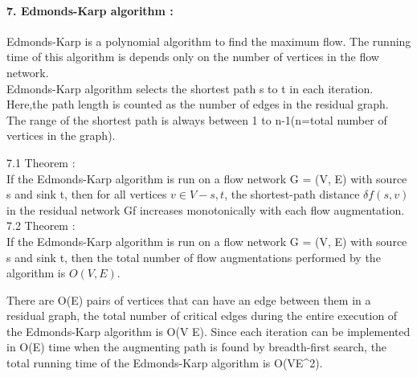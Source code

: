\documentclass[a4paper,12pt]{article}
\begin{document}
	      \paragraph*{7. Edmonds-Karp algorithm : \\}
	                      {
	                            Edmonds-Karp is a polynomial algorithm to find the maximum flow. The running time of this algorithm is depends only on the number of vertices in the flow network.\\
	                            Edmonds-Karp algorithm selects the shortest path s to t in each iteration. Here,the path length is counted as the number of edges in the residual graph. The range of the shortest path is always between 1 to n-1(n=total number of vertices in the graph).
	                            
	                            7.1 Theorem : \\
	                            If the Edmonds-Karp algorithm is run on a flow network G = (V, E) with source s and sink t, then for all vertices $ v \in V - {s, t} $, the shortest-path distance $ δf (s, v) $ in the residual network Gf increases monotonically with each flow augmentation.  \\  
	                            7.2 Theorem : \\
	             	            If the Edmonds-Karp algorithm is run on a flow network G = (V, E) with source s and sink t, then the total number of flow augmentations performed by the algorithm is $ O(V, E) $.
	             	            
	             	            There are O(E) pairs of vertices that can have an edge between them in a residual graph, the total number of critical edges during the entire execution of the Edmonds-Karp algorithm is O(V E). Since each iteration  can be implemented in O(E) time when the augmenting path is found by breadth-first search, the total running time of the Edmonds-Karp algorithm is O(VE^2). 
	             	            
	                   }
	    
	    
	    
\end{document}

